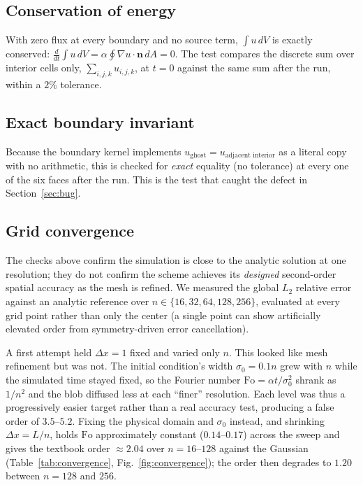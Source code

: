 \documentclass[conference]{IEEEtran}
\begin{document}
\subsection{Conservation of energy}

With zero flux at every boundary and no source term, $\int u \, dV$ is exactly
conserved: $\frac{d}{dt}\int u\,dV = \alpha \oint \nabla u \cdot \mathbf{n} \, dA = 0$.
The test compares the discrete sum over interior cells only,
$\sum_{i,j,k} u_{i,j,k}$, at $t=0$ against the same sum after the run, within a $2\%$
tolerance.

\subsection{Exact boundary invariant}

Because the boundary kernel implements $u_{\text{ghost}} = u_{\text{adjacent interior}}$
as a literal copy with no arithmetic, this is checked for \emph{exact} equality
(no tolerance) at every one of the six faces after the run. This is the test that
caught the defect in Section~\ref{sec:bug}.

\subsection{Grid convergence}
\label{sec:convergence}

The checks above confirm the simulation is close to the analytic solution at one
resolution; they do not confirm the scheme achieves its \emph{designed} second-order
spatial accuracy as the mesh is refined. We measured the global $L_2$ relative error
against an analytic reference over $n \in \{16, 32, 64, 128, 256\}$, evaluated at
every grid point rather than only the center (a single point can show artificially
elevated order from symmetry-driven error cancellation).

A first attempt held $\Delta x = 1$ fixed and varied only $n$. This looked like mesh
refinement but was not. The initial condition's width $\sigma_0 = 0.1n$ grew with $n$
while the simulated time stayed fixed, so the Fourier number
$\mathrm{Fo} = \alpha t/\sigma_0^2$ shrank as $1/n^2$ and the blob diffused less at
each ``finer'' resolution. Each level was thus a progressively easier target rather
than a real accuracy test, producing a false order of $3.5$--$5.2$. Fixing the physical
domain and
$\sigma_0$ instead, and shrinking $\Delta x = L/n$, holds $\mathrm{Fo}$ approximately
constant ($0.14$--$0.17$) across the sweep and gives the textbook order
$\approx 2.04$ over $n=16$--$128$ against the Gaussian
(Table~\ref{tab:convergence}, Fig.~\ref{fig:convergence}); the order then degrades to
$1.20$ between $n=128$ and $256$.
\end{document}
